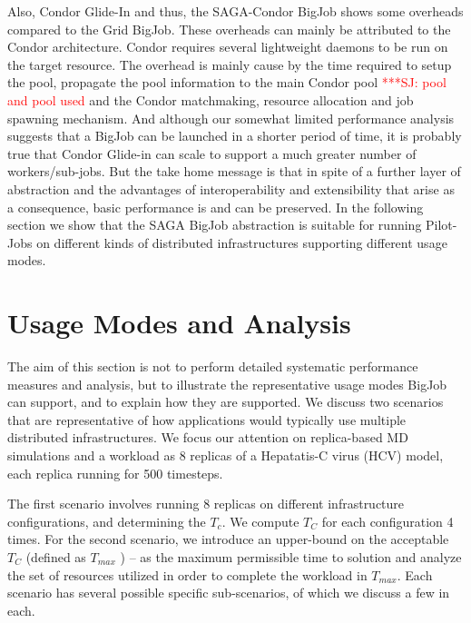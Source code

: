 \documentclass[conference,final]{IEEEtran}
\newcommand{\up}{\vspace*{-1em}}
\newcommand{\numrep}{8 }
\newcommand{\samplenum}{4 }
\newcommand{\tmax}{$T_{max}$ }
\newcommand{\tc}{$T_{C}$ }
\newcommand{\jhanote}[1]{ {\textcolor{red} { ***SJ: #1 }}}
\newcommand{\jhanote}[1]{}
\begin{document}
Also, Condor Glide-In and thus, the SAGA-Condor BigJob shows some
overheads compared to the Grid BigJob. These overheads can mainly be
attributed to the Condor architecture. Condor requires several
lightweight daemons to be run on the target resource. The overhead is
mainly cause by the time required to setup the pool, propagate the
pool information to the main Condor pool \jhanote{pool and pool used} and the Condor matchmaking,
resource allocation and job spawning mechanism. And although our
somewhat limited performance analysis suggests that a BigJob can be
launched in a shorter period of time, it is probably true that Condor
Glide-in can scale to support a much greater number of
workers/sub-jobs. But the take home message is that in spite of a
further layer of abstraction and the advantages of interoperability
and extensibility that arise as a consequence, basic performance is
and can be preserved.  In the following section we show that the SAGA
BigJob abstraction is suitable for running Pilot-Jobs on different
kinds of distributed infrastructures supporting different usage modes.


\up
\section{Usage Modes and Analysis}
\up

The aim of this section is not to perform detailed systematic
performance measures and analysis, but to illustrate the
representative usage modes BigJob can support, and to explain how they
are supported.  We discuss two scenarios that are representative of
how applications would typically use multiple distributed
infrastructures. We focus our attention on replica-based MD
simulations and a workload as \numrep replicas of a Hepatatis-C virus
(HCV) model, each replica running for 500 timesteps.  

The first scenario involves running \numrep replicas on different
infrastructure configurations, and determining the $T_c$. We compute
\tc for each configuration \samplenum times.  For the second scenario,
we introduce an upper-bound on the acceptable \tc (defined as \tmax)
-- as the maximum permissible time to solution and analyze the set of
resources utilized in order to complete the workload in
$T_{max}$. Each scenario has several possible specific sub-scenarios,
of which we discuss a few in each.  
\end{document}
